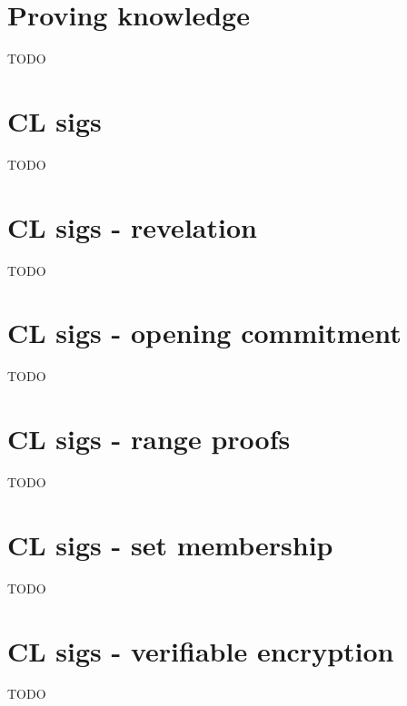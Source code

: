 \documentclass[a4paper]{article}
\begin{document}
\section{Proving knowledge}
TODO
\section{CL sigs}
TODO
\section{CL sigs - revelation}
TODO
\section{CL sigs - opening commitment}
TODO
\section{CL sigs - range proofs}
TODO
\section{CL sigs - set membership}
TODO
\section{CL sigs - verifiable encryption}
TODO
\end{document}
